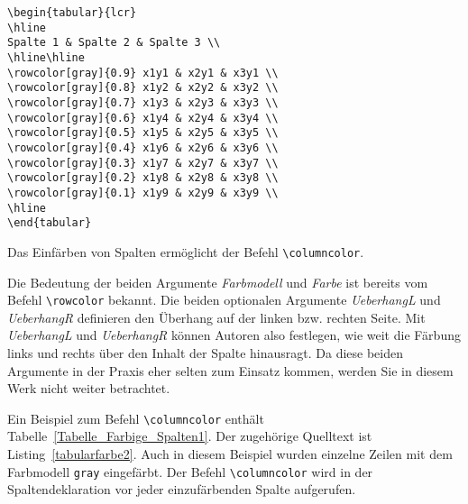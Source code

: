 \begin{lstlisting}[caption={Das Einfärben ganzer Tabellenzeilen ermöglicht der Befehl \texttt{rowcolor}},label=tabularfarbe1, style=customlatex]
\begin{tabular}{lcr}
\hline
Spalte 1 & Spalte 2 & Spalte 3 \\
\hline\hline
\rowcolor[gray]{0.9} x1y1 & x2y1 & x3y1 \\
\rowcolor[gray]{0.8} x1y2 & x2y2 & x3y2 \\
\rowcolor[gray]{0.7} x1y3 & x2y3 & x3y3 \\
\rowcolor[gray]{0.6} x1y4 & x2y4 & x3y4 \\
\rowcolor[gray]{0.5} x1y5 & x2y5 & x3y5 \\
\rowcolor[gray]{0.4} x1y6 & x2y6 & x3y6 \\
\rowcolor[gray]{0.3} x1y7 & x2y7 & x3y7 \\
\rowcolor[gray]{0.2} x1y8 & x2y8 & x3y8 \\
\rowcolor[gray]{0.1} x1y9 & x2y9 & x3y9 \\
\hline
\end{tabular}
\end{lstlisting}


Das Einfärben von Spalten ermöglicht der Befehl \verb!\columncolor!.



Die Bedeutung der beiden Argumente \textsl{Farbmodell} und \textsl{Farbe} ist bereits vom Befehl \verb!\rowcolor! bekannt. Die beiden optionalen Argumente
\textsl{UeberhangL} und \textsl{UeberhangR} definieren den Überhang auf der linken bzw. rechten Seite. Mit \textsl{UeberhangL} und \textsl{UeberhangR} können Autoren also festlegen, wie weit die Färbung links und 
rechts über den Inhalt der Spalte hinausragt. Da diese beiden Argumente in der Praxis eher selten zum Einsatz kommen, werden Sie in diesem Werk nicht weiter betrachtet.


Ein Beispiel zum Befehl \verb!\columncolor! enthält Tabelle~\ref{Tabelle_Farbige_Spalten1}. Der zugehörige Quelltext ist Listing~\ref{tabularfarbe2}. Auch in diesem Beispiel wurden einzelne Zeilen mit dem Farbmodell \verb!gray! eingefärbt. Der Befehl \verb!\columncolor! wird in der Spaltendeklaration vor jeder einzufärbenden Spalte aufgerufen.


